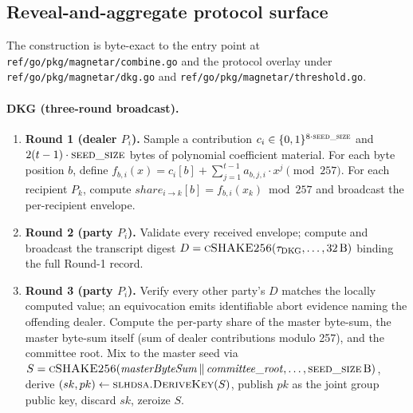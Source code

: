 \subsection{Reveal-and-aggregate protocol surface}
\label{app:reveal:surface}

The construction is byte-exact to the entry point at
\texttt{ref/go/pkg/magnetar/combine.go} and the protocol overlay
under \texttt{ref/go/pkg/magnetar/dkg.go} and
\texttt{ref/go/pkg/magnetar/threshold.go}.

\paragraph{DKG (three-round broadcast).}
\begin{enumerate}[leftmargin=2em,nosep]
  \item \textbf{Round 1 (dealer $P_i$).} Sample a contribution
        $c_i \in \{0,1\}^{8 \cdot \textsc{seed\_size}}$ and
        $2(t-1) \cdot \textsc{seed\_size}$ bytes of polynomial
        coefficient material. For each byte position $b$, define
        $f_{b,i}(x) = c_i[b] + \sum_{j=1}^{t-1} a_{b,j,i} \cdot
        x^j \pmod{257}$. For each recipient $P_k$, compute
        $\mathit{share}_{i \to k}[b] = f_{b,i}(x_k) \bmod 257$
        and broadcast the per-recipient envelope.
  \item \textbf{Round 2 (party $P_i$).} Validate every received
        envelope; compute and broadcast the transcript digest
        $D = \textsc{cSHAKE256}(
        \tau_{\mathrm{DKG}}, \ldots,
        32\,\mathrm{B})$ binding the full Round-1 record.
  \item \textbf{Round 3 (party $P_i$).} Verify every other party's
        $D$ matches the locally computed value; an equivocation
        emits identifiable abort evidence naming the offending
        dealer. Compute the per-party share of the master
        byte-sum, the master byte-sum itself (sum of dealer
        contributions modulo 257), and the committee root. Mix
        to the master seed via
        $S = \textsc{cSHAKE256}(
        \mathit{masterByteSum} \,\Vert\,
        \mathit{committee\_root}, \ldots,
        \textsc{seed\_size}\,\mathrm{B})$, derive $(sk, pk) \gets
        \textsc{slhdsa.DeriveKey}(S)$, publish $pk$ as the joint
        group public key, discard $sk$, zeroize $S$.
\end{enumerate}


